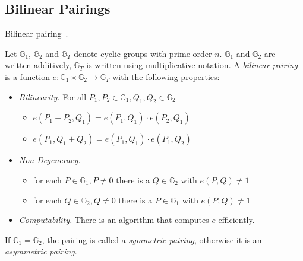 

\subsection{Bilinear Pairings}\label{sec:bilinear-pairings}

\begin{definition}Bilinear pairing~\cite{kiraz_still_2016}.

    Let $\mathbb{G}_1$, $\mathbb{G}_2$ and $\mathbb{G}_T$ denote cyclic groups with prime order $n$.
$\mathbb{G}_1$ and $\mathbb{G}_2$ are written additively, $\mathbb{G}_T$ is written using multiplicative notation.
    A \emph{bilinear pairing} is a function $e: \mathbb{G}_1 \times \mathbb{G}_2 \rightarrow \mathbb{G}_T$ with the following properties:
    \begin{itemize}
        \item \emph{Bilinearity.} For all $P_1, P_2 \in \mathbb{G}_1, Q_1, Q_2 \in \mathbb{G}_2$
        \begin{itemize}
            \item $e(P_1+P_2, Q_1) = e(P_1,Q_1)\cdot e(P_2,Q_1)$
            \item $e(P_1, Q_1+Q_2)=e(P_1,Q_1)\cdot e(P_1,Q_2)$
        \end{itemize}
        \item \emph{Non-Degeneracy.}
        \begin{itemize}
            \item for each $P \in \mathbb{G}_1, P \neq 0$ there is a $Q \in \mathbb{G}_2$ with $e(P, Q) \neq 1$
            \item for each $Q \in \mathbb{G}_2, Q \neq 0$ there is a $P \in \mathbb{G}_1$ with $e(P, Q) \neq 1$
        \end{itemize}
        \item \emph{Computability.} There is an algorithm that computes $e$ efficiently.
    \end{itemize}
    If $\mathbb{G}_1 = \mathbb{G}_2$, the pairing is called a \emph{symmetric pairing}, otherwise it is an \emph{asymmetric pairing}.
\end{definition}

